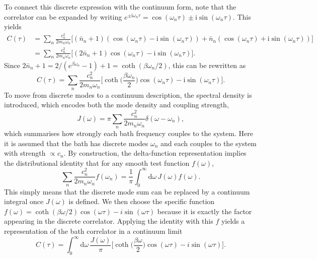 To connect this discrete expression with the continuum form, note that the correlator can be expanded by writing $e^{\pm \mathrm{i} \omega_n \tau} = \cos(\omega_n \tau) \pm \mathrm{i} \sin(\omega_n \tau)$. This yields
\begin{equation*}
	\begin{aligned}
		C(\tau) & = \sum_{n} \frac{c_n^2}{2 m_n \omega_n} \Big[ (\bar{n}_n+1)(\cos(\omega_n \tau) - \mathrm{i} \sin(\omega_n \tau)) + \bar{n}_n(\cos(\omega_n \tau) + \mathrm{i} \sin(\omega_n \tau)) \Big] \\
		& = \sum_{n} \frac{c_n^2}{2 m_n \omega_n} \Big[(2 \bar{n}_n + 1) \cos(\omega_n \tau) - \mathrm{i} \sin(\omega_n \tau)\Big].
	\end{aligned}
\end{equation*}
Since \(2\bar{n}_n + 1 = 2/(e^{\beta \omega_n}-1) + 1 = \coth(\beta \omega_n / 2)\), this can be rewritten as
\begin{equation*}
	C(\tau) = \sum_{n} \frac{c_n^2}{2 m_n \omega_n} \Big[ \coth\Big(\frac{\beta \omega_n}{2}\Big) \cos(\omega_n \tau) - \mathrm{i} \sin(\omega_n \tau) \Big].
\end{equation*}
To move from discrete modes to a continuum description, the spectral density is introduced, which encodes both the mode density and coupling strength,
\begin{equation*}
	J(\omega) = \pi \sum_{n} \frac{c_n^2}{2 m_n \omega_n} \delta(\omega - \omega_n),
\end{equation*}
which summarises how strongly each bath frequency couples to the system. Here it is assumed that the bath has discrete modes $\omega_n$ and each couples to the system with strength $\propto c_n$. By construction, the delta-function representation implies the distributional identity that for any smooth test function $f(\omega)$,
\begin{equation*}
	\sum_{n} \frac{c_n^2}{2 m_n \omega_n} f(\omega_n) = \frac{1}{\pi} \int_{0}^{\infty}\!\mathrm{d}\omega\, J(\omega) f(\omega).
\end{equation*}
This simply means that the discrete mode sum can be replaced by a continuum integral once $J(\omega)$ is defined. We then choose the specific function $f(\omega) = \coth(\beta \omega / 2) \cos(\omega \tau) - i \sin(\omega \tau)$ because it is exactly the factor appearing in the discrete correlator. Applying the identity with this $f$ yields a representation of the bath correlator in a continuum limit
\begin{equation}
	C(\tau) = \int_{0}^{\infty}\!\mathrm{d}\omega \, \frac{J(\omega)}{\pi} \Big[ \coth\Big(\frac{\beta \omega}{2}\Big) \cos(\omega \tau) - i \sin(\omega \tau) \Big].
	\label{eq:oqs_ho_correlator_spectral_density}
\end{equation}
